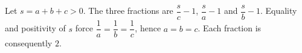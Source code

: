 Let $s=a+b+c>0$. The three fractions are $\dfrac{s}{c}-1$, $\dfrac{s}{a}-1$ and $\dfrac{s}{b}-1$. Equality and positivity of $s$ force $\dfrac{1}{a}=\dfrac{1}{b}=\dfrac{1}{c}$, hence $a=b=c$. Each fraction is consequently $\boxed2$.
